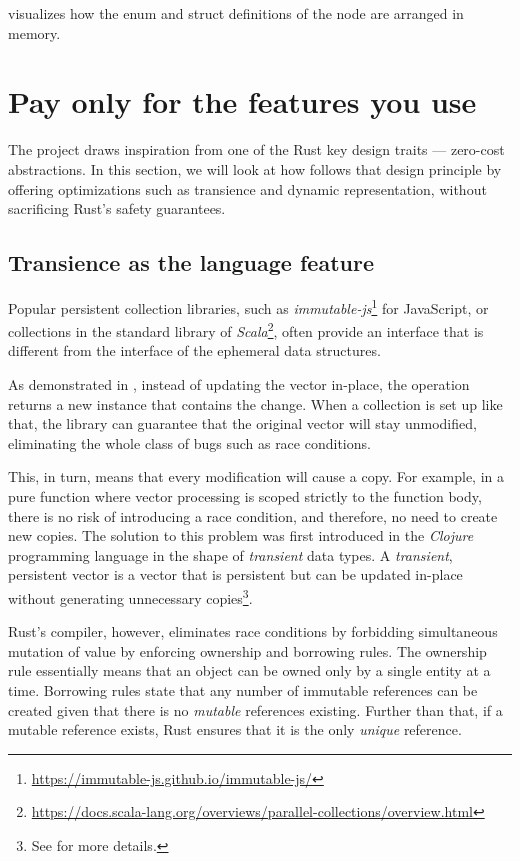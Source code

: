  visualizes how the enum and struct definitions of the \rrbtree{} node are arranged in memory.

\section{Pay only for the features you use}
The \pvecrs{} project draws inspiration from one of the Rust key design traits --- zero-cost abstractions. In this section, we will look at how \pvec{} follows that design principle by offering optimizations such as transience and dynamic representation, without sacrificing Rust's safety guarantees.

\subsection{Transience as the language feature}
Popular persistent collection libraries, such as \emph{immutable-js}\footnote{\url{https://immutable-js.github.io/immutable-js/}} for JavaScript, or collections in the standard library of \emph{Scala}\footnote{\url{https://docs.scala-lang.org/overviews/parallel-collections/overview.html}}, often provide an interface that is different from the interface of the ephemeral data structures.

As demonstrated in , instead of updating the vector in-place, the operation returns a new instance that contains the change. When a collection is set up like that, the library can guarantee that the original vector will stay unmodified, eliminating the whole class of bugs such as race conditions.

This, in turn, means that every modification will cause a copy. For example, in a pure function where vector processing is scoped strictly to the function body, there is no risk of introducing a race condition, and therefore, no need to create new copies. The solution to this problem was first introduced in the \emph{Clojure} programming language in the shape of \emph{transient} data types. A \emph{transient}, persistent vector is a vector that is persistent but can be updated in-place without generating unnecessary copies\footnote{See  for more details.}.

Rust's compiler, however, eliminates race conditions by forbidding simultaneous mutation of value by enforcing ownership and borrowing rules. The ownership rule essentially means that an object can be owned only by a single entity at a time. Borrowing rules state that any number of immutable references can be created given that there is no \emph{mutable} references existing. Further than that, if a mutable reference exists, Rust ensures that it is the only \emph{unique} reference.

